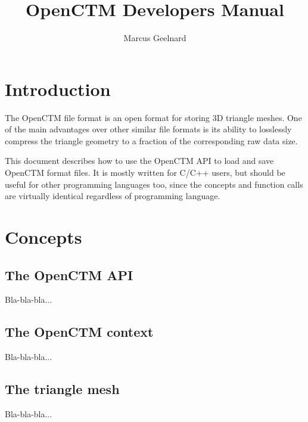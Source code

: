 

\author{Marcus Geelnard}
\title{OpenCTM Developers Manual}




\maketitle

\tableofcontents



\chapter{Introduction}
The OpenCTM file format is an open format for storing 3D triangle meshes.
One of the main advantages over other similar file formats is its ability
to losslessly compress the triangle geometry to a fraction of the corresponding
raw data size.

This document describes how to use the OpenCTM API to load and save OpenCTM
format files. It is mostly written for C/C++ users, but should be useful for
other programming languages too, since the concepts and function calls are
virtually identical regardless of programming language.



\chapter{Concepts}

\section{The OpenCTM API}
Bla-bla-bla...

\section{The OpenCTM context}
Bla-bla-bla...

\section{The triangle mesh}
Bla-bla-bla...



